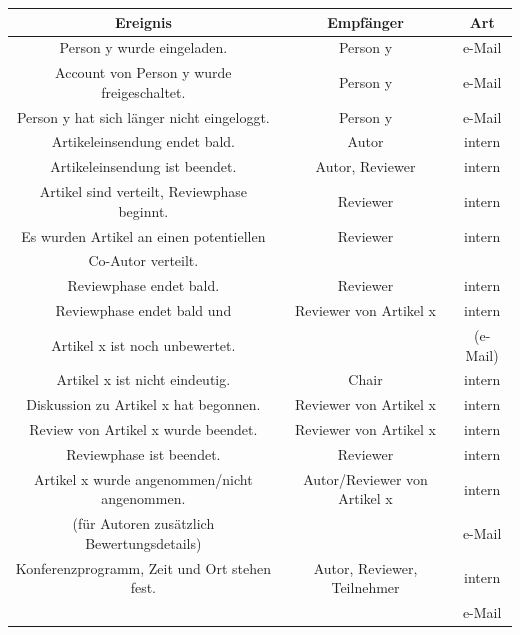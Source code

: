 \documentclass[headexclude,footexclude,12pt,BCOR0pt,DIV15]{scrartcl}
\begin{document}
    \begin{tabular}{|c|c|c|}
      \hline
      \textbf{Ereignis} & \textbf{Empf\"{a}nger} & \textbf{Art} \\
      \hline
      \hline
      Person y wurde eingeladen. & Person y & e-Mail \\
      \hline
      Account von Person y wurde freigeschaltet. & Person y & e-Mail \\
      \hline
      Person y hat sich l\"{a}nger nicht eingeloggt. & Person y & e-Mail \\
      \hline
      Artikeleinsendung endet bald. & Autor & intern \\
      \hline
      Artikeleinsendung ist beendet. & Autor, Reviewer & intern \\
      \hline
      Artikel sind verteilt, Reviewphase beginnt. & Reviewer & intern \\
      \hline
      Es wurden Artikel an einen potentiellen & Reviewer & intern \\
      Co-Autor verteilt. & & \\
      \hline
      Reviewphase endet bald. & Reviewer & intern \\
      \hline
      Reviewphase endet bald und & Reviewer von Artikel x & intern \\
      Artikel x ist noch unbewertet. & & (e-Mail) \\
      \hline
      Artikel x ist nicht eindeutig. & Chair & intern \\
      \hline
      Diskussion zu Artikel x hat begonnen. & Reviewer von Artikel x & intern \\
      \hline
      Review von Artikel x wurde beendet. & Reviewer von Artikel x & intern \\
      \hline
      Reviewphase ist beendet. & Reviewer & intern \\
      \hline
      Artikel x wurde angenommen/nicht angenommen. & Autor/Reviewer von Artikel x & intern \\
      (f\"{u}r Autoren zus\"{a}tzlich Bewertungsdetails) & & e-Mail \\
      \hline
      Konferenzprogramm, Zeit und Ort stehen fest. & Autor, Reviewer, Teilnehmer & intern \\
       & & e-Mail \\
      \hline
    \end{tabular}

    \pagebreak
\end{document}
